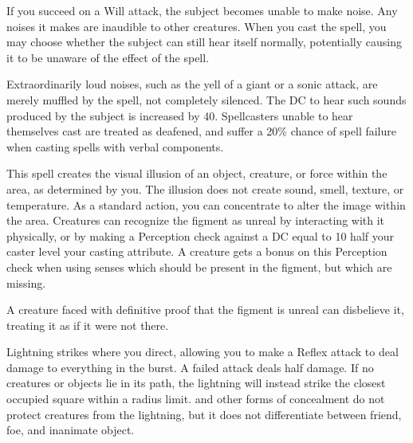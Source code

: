 \spelldur{\durshort \dismissable}
\spelleffect If you succeed on a Will attack, the subject becomes unable to make noise. Any noises it makes are inaudible to other creatures. When you cast the spell, you may choose whether the subject can still hear itself normally, potentially causing it to be unaware of the effect of the spell.

Extraordinarily loud noises, such as the yell of a giant or a sonic attack, are merely muffled by the spell, not completely silenced. The DC to hear such sounds produced by the subject is increased by 40.
\spellnotes Spellcasters unable to hear themselves cast are treated as deafened, and suffer a 20\% chance of spell failure when casting spells with verbal components.

\spelldur{\durshort}
\spellline
\spelleffect This spell creates the visual illusion of an object, creature, or force within the area, as determined by you. The illusion does not create sound, smell, texture, or temperature. As a standard action, you can concentrate to alter the image within the area.
\spellnotes Creatures can recognize the figment as unreal by interacting with it physically, or by making a Perception check against a DC equal to 10 \add half your caster level \add your casting attribute. A creature gets a  bonus on this Perception check when using senses which should be present in the figment, but which are missing.

A creature faced with definitive proof that the figment is unreal can disbelieve it, treating it as if it were not there.

\spelleffect Lightning strikes where you direct, allowing you to make a Reflex attack to deal damage to everything in the burst. A failed attack deals half damage. If no creatures or objects lie in its path, the lightning will instead strike the closest occupied square within a \areamed radius limit.
\spellnotes {} and other forms of concealment do not protect creatures from the lightning, but it does not differentiate between friend, foe, and inanimate object.

